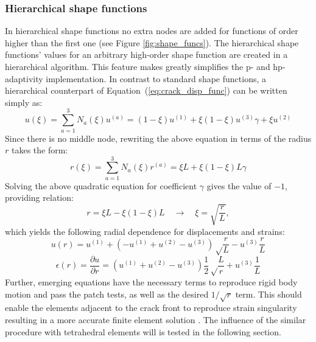 \documentclass[11pt]{acmeArticle}
\numberwithin{equation}{section}
\begin{document}
\subsubsection{Hierarchical shape functions}
In hierarchical shape functions \citep{Ainsworth2003} no extra nodes are added for functions of order higher than the first one (see Figure \ref{fig:shape_funcs}). The hierarchical shape functions' values for an arbitrary high-order shape function are created in a hierarchical algorithm. This feature makes greatly simplifies the p- and hp- adaptivity implementation. In contrast to standard shape functions, a hierarchical counterpart of Equation~(\ref{eq:crack_disp_func}) can be written simply as:
\begin{equation}
u(\xi) = \sum_{a=1}^3 N_a (\xi) u^{(a)} = (1 -\xi)u^{(1)} + \xi(1 - \xi)u^{(3)}\gamma + \xi u^{(2)}
\end{equation}
Since there is no middle node, rewriting the above equation in terms of the radius $r$ takes the form:
\begin{equation}
r(\xi) = \sum_{a=1}^3 N_a (\xi) r^{(a)} = \xi L + \xi(1-\xi)  L  \gamma
\end{equation}
Solving the above quadratic equation for coefficient $\gamma$ gives the value of $-1$, providing relation:
\begin{equation}
r= \xi L - \xi(1-\xi)L \quad \rightarrow \quad \xi = \sqrt{\frac{r}{L}},
\end{equation}
which yields the following radial dependence for displacements and strains:
\begin{equation*}
u(r) = u^{(1)} + \left( -u^{(1)} + u^{(2)} - u^{(3)} \right) \sqrt \frac{r}{L} - u^{(3)} \frac{r}{L}
\end{equation*}
\begin{equation}
\epsilon(r) = \frac{\partial u}{\partial r} = \left( u^{(1)}  + u^{(2)} - u^{(3)}  \right) \frac{1}{2} \sqrt \frac{L}{r} + u^{(3)} \frac{1}{L}
\end{equation}
Further, emerging equations have the necessary terms to reproduce rigid body motion and pass the patch tests, as well as the desired $1 / \sqrt r$ term.
This should enable the elements adjacent to the crack front to reproduce strain singularity resulting in a more accurate finite element solution \citep{nejati2015use}. The influence of the similar procedure with tetrahedral elements will is tested in the following section.
\end{document}
